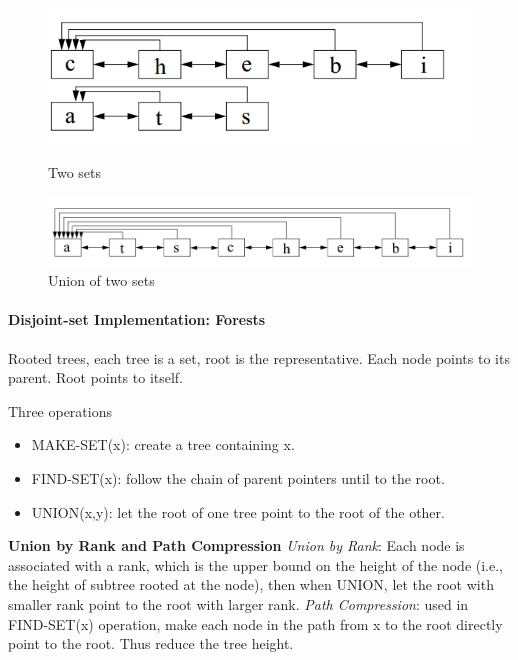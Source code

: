 \begin{figure}[ht]
\begin{minipage}[b]{0.5\linewidth}
\centering
\includegraphics[width=\textwidth]{./Figures/Mitosis_3.png}
\caption{Two sets}
\label{fig:mitosis_3}
\end{minipage}
\hspace{0.5cm}
\begin{minipage}[b]{0.5\linewidth}
\centering
\includegraphics[width=\textwidth]{./Figures/Mitosis_4.png}
\caption{Union of two sets}
\label{fig:mitosis_4}
\end{minipage}
\end{figure}

\paragraph{Disjoint-set Implementation: Forests}
Rooted trees, each tree is a set, root is the representative. Each node points to its parent. Root points to itself.

Three operations
\begin{itemize}
\item MAKE-SET(x): create a tree containing x.  
\item FIND-SET(x): follow the chain of parent pointers until to the root. 
\item UNION(x,y): let the root of one tree point to the root of the other.  
\end{itemize}

\textbf{Union by Rank and  Path Compression}
\textit{Union by Rank}: Each node is associated with a rank, which is the upper bound on the height of the node (i.e., the height of subtree rooted at the node), then when UNION, let the root with smaller rank point to the root with larger rank. 
\textit{Path Compression}: used in FIND-SET(x) operation, make each node in the path from x to the root  directly point to the root. Thus reduce the tree height.

